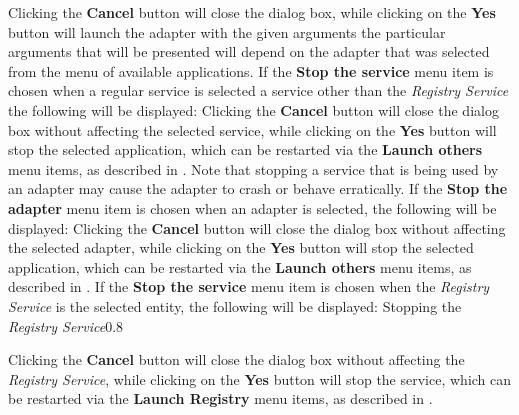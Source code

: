 Clicking the \textbf{Cancel} button will close the dialog box, while clicking on the
\textbf{Yes} button will launch the adapter with the given arguments \longDash{} the
particular arguments that will be presented will depend on the adapter that was selected
from the menu of available applications.
\secondaryEnd
{}
If the \textbf{Stop the service} menu item is chosen when a regular service is selected
\longDash{} a service other than the \emph{Registry Service} \longDash{} the following
will be displayed:
\condPage{}
Clicking the \textbf{Cancel} button will close the dialog box without affecting the
selected service, while clicking on the \textbf{Yes} button will stop the selected
application, which can be restarted via the \textbf{Launch others \textellipsis} menu
items, as described in .
Note that stopping a service that is being used by an adapter may cause the adapter to
crash or behave erratically.
\secondaryEnd
{}
If the \textbf{Stop the adapter} menu item is chosen when an adapter is selected, the
following will be displayed:
\condPage{}
Clicking the \textbf{Cancel} button will close the dialog box without affecting the
selected adapter, while clicking on the \textbf{Yes} button will stop the selected
application, which can be restarted via the \textbf{Launch others \textellipsis} menu
items, as described in .
\secondaryEnd
{}
If the \textbf{Stop the service} menu item is chosen when the \emph{Registry Service} is
the selected entity, the following will be displayed:
%
{Stopping the \emph{Registry Service}}{0.8}

Clicking the \textbf{Cancel} button will close the dialog box without affecting the
\emph{Registry Service}, while clicking on the \textbf{Yes} button will stop the service,
which can be restarted via the \textbf{Launch Registry} menu items, as described in
.
\secondaryEnd
\primaryEnd{}